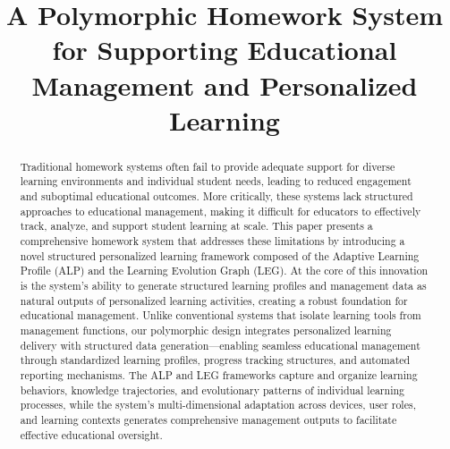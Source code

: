 \documentclass[conference]{IEEEtran}
\begin{document}
\title{\title{A Polymorphic Homework System for Supporting Educational Management and Personalized Learning}}

\author{
}

\maketitle
\begin{abstract}
Traditional homework systems often fail to provide adequate support for diverse learning environments and individual student needs, leading to reduced engagement and suboptimal educational outcomes. More critically, these systems lack structured approaches to educational management, making it difficult for educators to effectively track, analyze, and support student learning at scale. This paper presents a comprehensive homework system that addresses these limitations by introducing a novel structured personalized learning framework composed of the Adaptive Learning Profile (ALP) and the Learning Evolution Graph (LEG). At the core of this innovation is the system’s ability to generate structured learning profiles and management data as natural outputs of personalized learning activities, creating a robust foundation for educational management. Unlike conventional systems that isolate learning tools from management functions, our polymorphic design integrates personalized learning delivery with structured data generation—enabling seamless educational management through standardized learning profiles, progress tracking structures, and automated reporting mechanisms. The ALP and LEG frameworks capture and organize learning behaviors, knowledge trajectories, and evolutionary patterns of individual learning processes, while the system’s multi-dimensional adaptation across devices, user roles, and learning contexts generates comprehensive management outputs to facilitate effective educational oversight.
\end{abstract}
\end{document}
